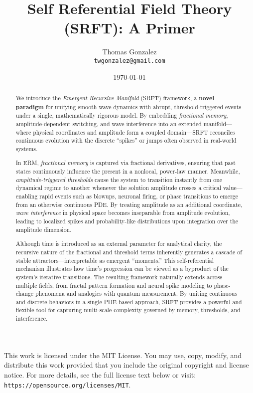 \documentclass[12pt]{article}
\title{Self Referential Field Theory (SRFT): A Primer}
\author{%
  Thomas Gonzalez \\
  \small \texttt{twgonzalez@gmail.com}
}
\date{\today}
\begin{document}
\maketitle

\vfill
\noindent\hrulefill
\medskip

\noindent 
This work is licensed under the MIT License. You may use, copy, modify, and distribute this work provided that you include the original copyright and license notice.  For more details, see the full license text below or visit: \texttt{https://opensource.org/licenses/MIT}.
\medskip \\

\newpage

\maketitle

\begin{abstract}
We introduce the \emph{Emergent Recursive Manifold} (SRFT) framework, a \textbf{novel paradigm} for unifying smooth wave dynamics with abrupt, threshold-triggered events under a single, mathematically rigorous model. By embedding \emph{fractional memory}, amplitude-dependent switching, and wave interference into an extended manifold---where physical coordinates and amplitude form a coupled domain---SRFT reconciles continuous evolution with the discrete ``spikes'' or jumps often observed in real-world systems.

In ERM, \emph{fractional memory} is captured via fractional derivatives, ensuring that past states continuously influence the present in a nonlocal, power-law manner. Meanwhile, \emph{amplitude-triggered thresholds} cause the system to transition instantly from one dynamical regime to another whenever the solution amplitude crosses a critical value---enabling rapid events such as blowups, neuronal firing, or phase transitions to emerge from an otherwise continuous PDE. By treating amplitude as an additional coordinate, \emph{wave interference} in physical space becomes inseparable from amplitude evolution, leading to localized spikes and probability-like distributions upon integration over the amplitude dimension.

Although time is introduced as an external parameter for analytical clarity, the recursive nature of the fractional and threshold terms inherently generates a cascade of stable attractors---interpretable as emergent ``moments.'' This self-referential mechanism illustrates how time's progression can be viewed as a byproduct of the system's iterative transitions. The resulting framework naturally extends across multiple fields, from fractal pattern formation and neural spike modeling to phase-change phenomena and analogies with quantum measurement. By uniting continuous and discrete behaviors in a single PDE-based approach, SRFT provides a powerful and flexible tool for capturing multi-scale complexity governed by memory, thresholds, and interference.
\end{abstract}
\end{document}
